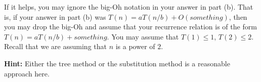 \documentclass[12pt]{article}
\begin{document}
If it helps, you may ignore the big-Oh notation in your answer in part (b). That is, if your answer in part (b) was $T(n) = a T(n/b) + O(something)$, then you may drop the big-Oh and assume that your recurrence relation is of the form
$T (n) = a T (n/b) + something$. You may assume that $T(1) \leq 1$, $T(2) \leq 2$. Recall that we are assuming that $n$ is a power of $2$.

\textbf{Hint:} Either the tree method or the substitution method is a reasonable approach here.

\end{document}
